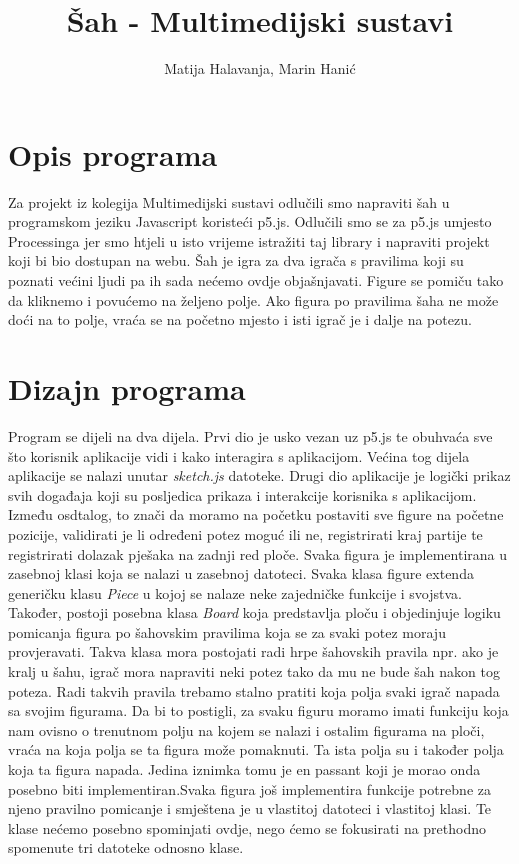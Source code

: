 \documentclass[11pt]{article}
\begin{document}
\author{Matija Halavanja, Marin Hanić}
\title{Šah - Multimedijski sustavi}
\maketitle
\tableofcontents

\section{Opis programa}
Za projekt iz kolegija Multimedijski sustavi odlučili smo napraviti šah u programskom jeziku Javascript koristeći p5.js.
Odlučili smo se za p5.js umjesto Processinga jer smo htjeli u isto vrijeme istražiti taj library i napraviti projekt koji
bi bio dostupan na webu. Šah je igra za dva igrača s pravilima koji su poznati većini ljudi pa ih sada nećemo ovdje objašnjavati.
Figure se pomiču tako da kliknemo i povućemo na željeno polje. Ako figura po pravilima šaha ne može doći na to polje, vraća se na
početno mjesto i isti igrač je i dalje na potezu.

\section{Dizajn programa}
Program se dijeli na dva dijela. Prvi dio je usko vezan uz p5.js te obuhvaća sve što korisnik aplikacije vidi i kako
interagira s aplikacijom. Većina tog dijela aplikacije se nalazi unutar \textit{sketch.js} datoteke. Drugi dio aplikacije je logički prikaz
svih događaja koji su posljedica prikaza i interakcije korisnika s aplikacijom. Između osdtalog, to znači da moramo na početku 
postaviti sve figure na početne pozicije, validirati je li određeni potez moguć ili ne, registrirati kraj partije te
registrirati dolazak pješaka na zadnji red ploče. Svaka figura je implementirana u zasebnoj klasi koja se nalazi u zasebnoj datoteci.
Svaka klasa figure extenda generičku klasu \textit{Piece} u kojoj se nalaze neke zajedničke funkcije i svojstva. Također, postoji posebna
klasa \textit{Board} koja predstavlja ploču i objedinjuje logiku pomicanja figura po šahovskim pravilima koja se za svaki potez moraju
provjeravati. Takva klasa mora postojati radi hrpe šahovskih pravila npr. ako je kralj u šahu, igrač mora napraviti neki potez tako da mu ne
bude šah nakon tog poteza. Radi takvih pravila trebamo stalno pratiti koja polja svaki igrač napada sa svojim figurama. Da bi to postigli,
za svaku figuru moramo imati funkciju koja nam ovisno o trenutnom polju na kojem se nalazi i ostalim figurama na ploči, vraća na koja polja
se ta figura može pomaknuti. Ta ista polja su i također polja koja ta figura napada. Jedina iznimka tomu je en passant koji je morao onda posebno
biti implementiran.Svaka figura još implementira funkcije potrebne za njeno pravilno pomicanje i smještena je u vlastitoj datoteci i vlastitoj klasi.
Te klase nećemo posebno spominjati ovdje, nego ćemo se fokusirati na prethodno spomenute tri datoteke odnosno klase.
\end{document}
